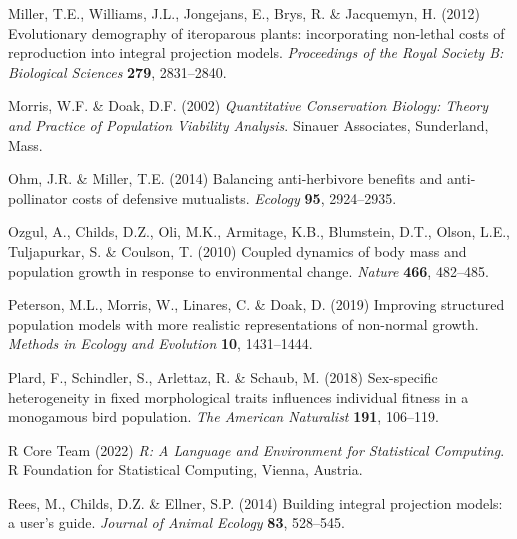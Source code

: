 \documentclass[12pt]{article}
\begin{document}
\begin{spacing}{1.9}
\begin{thebibliography}{62}
Miller, T.E., Williams, J.L., Jongejans, E., Brys, R. \& Jacquemyn, H. (2012)
  Evolutionary demography of iteroparous plants: incorporating non-lethal costs
  of reproduction into integral projection models. \emph{Proceedings of the
  Royal Society B: Biological Sciences} \textbf{279}, 2831--2840.

Morris, W.F. \& Doak, D.F. (2002) \emph{Quantitative Conservation Biology:
  Theory and Practice of Population Viability Analysis}. Sinauer Associates,
  Sunderland, Mass.

Ohm, J.R. \& Miller, T.E. (2014) Balancing anti-herbivore benefits and
  anti-pollinator costs of defensive mutualists. \emph{Ecology} \textbf{95},
  2924--2935.

Ozgul, A., Childs, D.Z., Oli, M.K., Armitage, K.B., Blumstein, D.T., Olson,
  L.E., Tuljapurkar, S. \& Coulson, T. (2010) Coupled dynamics of body mass and
  population growth in response to environmental change. \emph{Nature}
  \textbf{466}, 482--485.

Peterson, M.L., Morris, W., Linares, C. \& Doak, D. (2019) Improving structured
  population models with more realistic representations of non-normal growth.
  \emph{Methods in Ecology and Evolution} \textbf{10}, 1431--1444.

Plard, F., Schindler, S., Arlettaz, R. \& Schaub, M. (2018) Sex-specific
  heterogeneity in fixed morphological traits influences individual fitness in
  a monogamous bird population. \emph{The American Naturalist} \textbf{191},
  106--119.

{R Core Team} (2022) \emph{R: A Language and Environment for Statistical
  Computing}. R Foundation for Statistical Computing, Vienna, Austria.

Rees, M., Childs, D.Z. \& Ellner, S.P. (2014) Building integral projection
  models: a user's guide. \emph{Journal of Animal Ecology} \textbf{83},
  528--545.


\end{thebibliography}
\end{spacing}
\end{document}
